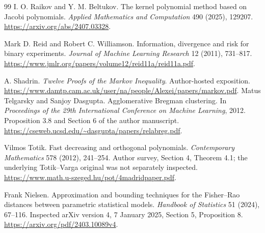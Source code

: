 \documentclass[11pt]{article}
\theoremstyle{definition}\newtheorem{definition}[theorem]{Definition}
\theoremstyle{remark}\newtheorem{remark}[theorem]{Remark}
\begin{document}
\begin{thebibliography}{99}
I. O. Raikov and Y. M. Beltukov.
The kernel polynomial method based on Jacobi polynomials.
\emph{Applied Mathematics and Computation} 490 (2025), 129207.
\url{https://arxiv.org/abs/2407.03328}.

Mark D. Reid and Robert C. Williamson.
Information, divergence and risk for binary experiments.
\emph{Journal of Machine Learning Research} 12 (2011), 731--817.
\url{https://www.jmlr.org/papers/volume12/reid11a/reid11a.pdf}.

A. Shadrin.
\emph{Twelve Proofs of the Markov Inequality}.
Author-hosted exposition.
\url{https://www.damtp.cam.ac.uk/user/na/people/Alexei/papers/markov.pdf}.
Matus Telgarsky and Sanjoy Dasgupta.
Agglomerative Bregman clustering.
In \emph{Proceedings of the 29th International Conference on Machine Learning}, 2012.
Proposition 3.8 and Section 6 of the author manuscript.
\url{https://cseweb.ucsd.edu/~dasgupta/papers/relabreg.pdf}.

Vilmos Totik.
Fast decreasing and orthogonal polynomials.
\emph{Contemporary Mathematics} 578 (2012), 241--254.
Author survey, Section 4, Theorem 4.1; the underlying Totik--Varga original was not separately inspected.
\url{https://www.math.u-szeged.hu/pot/4madridpaper.pdf}.

Frank Nielsen.
Approximation and bounding techniques for the Fisher--Rao distances between parametric statistical models.
\emph{Handbook of Statistics} 51 (2024), 67--116.
Inspected arXiv version 4, 7 January 2025, Section 5, Proposition 8.
\url{https://arxiv.org/pdf/2403.10089v4}.
\end{thebibliography}
\end{document}
